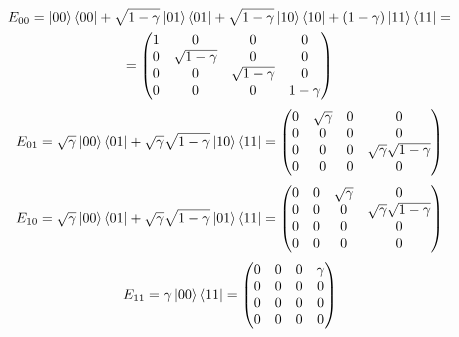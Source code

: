 \documentclass{masterthesis}
\begin{document}
\begin{multline}\label{eq:op-el-1}
    E_{00} = \ket{00}\bra{00} + \sqrt{1-\gamma}\ket{01}\bra{01} + \sqrt{1-\gamma}\ket{10}\bra{10} + (1-\gamma)\ket{11}\bra{11} = \\
    = \begin{pmatrix} 1 & 0 & 0 & 0 \\ 0 & \sqrt{1-\gamma} & 0 & 0 \\ 0 & 0 & \sqrt{1-\gamma} & 0 \\ 0 & 0 & 0 & 1-\gamma \end{pmatrix}
\end{multline}
\begin{equation}\label{eq:op-el-2}
    E_{01} = \sqrt{\gamma}\ket{00}\bra{01} + \sqrt{\gamma}\sqrt{1-\gamma}\ket{10}\bra{11}
    = \begin{pmatrix} 0 & \sqrt{\gamma} & 0 & 0 \\ 0 & 0 & 0 & 0 \\ 0 & 0 & 0 & \sqrt{\gamma}\sqrt{1-\gamma} \\ 0 & 0 & 0 & 0 \end{pmatrix}
\end{equation}
\begin{equation}\label{eq:op-el-3}
    E_{10} = \sqrt{\gamma}\ket{00}\bra{01} + \sqrt{\gamma}\sqrt{1-\gamma}\ket{01}\bra{11}  
    = \begin{pmatrix} 0 & 0 & \sqrt{\gamma} & 0 \\ 0 & 0 & 0 & \sqrt{\gamma}\sqrt{1-\gamma} \\ 0 & 0 & 0 & 0 \\ 0 & 0 & 0 & 0 \end{pmatrix}
\end{equation}
\begin{equation}\label{eq:op-el-4}
    E_{11} = \gamma \ket{00}\bra{11}
    = \begin{pmatrix} 0 & 0 & 0 & \gamma \\ 0 & 0 & 0 & 0 \\ 0 & 0 & 0 & 0 \\ 0 & 0 & 0 & 0 \end{pmatrix}
\end{equation}
\end{document}
